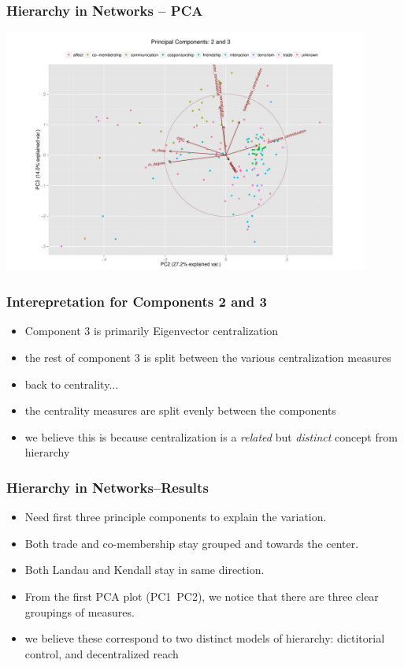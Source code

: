 \documentclass{beamer}
\newenvironment{changemargin}[2]{%
	\begin{list}{}{%
			\setlength{\topsep}{0pt}%
			\setlength{\leftmargin}{#1}%
			\setlength{\rightmargin}{#2}%
			\setlength{\listparindent}{\parindent}%
			\setlength{\itemindent}{\parindent}%
			\setlength{\parsep}{\parskip}%
		}%
		\item[]}{\end{list}}
\begin{document}
\begin{frame}\frametitle{Hierarchy in Networks -- PCA}
	\begin{changemargin}{-2cm}{ -2cm}
		\centering
		\includegraphics[width=12cm, height=8cm]{images/Observed_PCA_Components2_3.pdf}
	\end{changemargin}
\end{frame}

\begin{frame}\frametitle{Interepretation for Components 2 and 3}
	\begin{itemize}
		\item Component 3 is primarily Eigenvector centralization
		\item the rest of component 3 is split between the various centralization measures
		\item back to centrality...
		\item the centrality measures are split evenly between the components
		\item we believe this is because centralization is a \emph{related} but \emph{distinct} concept from hierarchy
	\end{itemize}
\end{frame}


\begin{frame}\frametitle{Hierarchy in Networks--Results}
	\begin{itemize}
		\item Need first three principle components to explain the variation.
		\item Both trade and co-membership stay grouped and towards the center. 
		\item Both Landau and Kendall stay in same direction.
		\item From the first PCA plot (PC1~PC2), we notice that there are three clear groupings of measures.
		\item we believe these correspond to two distinct models of hierarchy: dictitorial control, and decentralized reach
	\end{itemize}
\end{frame}
\end{document}
